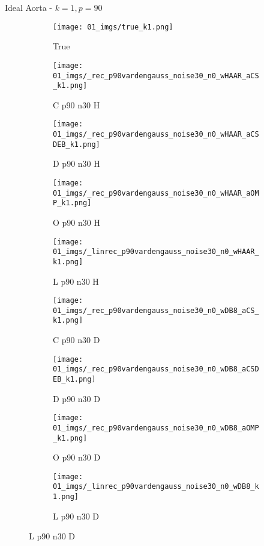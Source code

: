 \begin{frame}{Ideal Aorta - $k=1,p=90$}{}
\begin{figure}
\begin{subfigure}{0.1\textwidth}
\texttt{[image: 01\_imgs/true\_k1.png]}
\caption*{\Tiny True}
\end{subfigure}
\begin{subfigure}{0.1\textwidth}
\texttt{[image: 01\_imgs/\_rec\_p90vardengauss\_noise30\_n0\_wHAAR\_aCS\_k1.png]}
\caption*{\Tiny C p90 n30 H}
\end{subfigure}
\begin{subfigure}{0.1\textwidth}
\texttt{[image: 01\_imgs/\_rec\_p90vardengauss\_noise30\_n0\_wHAAR\_aCSDEB\_k1.png]}
\caption*{\Tiny D p90 n30 H}
\end{subfigure}
\begin{subfigure}{0.1\textwidth}
\texttt{[image: 01\_imgs/\_rec\_p90vardengauss\_noise30\_n0\_wHAAR\_aOMP\_k1.png]}
\caption*{\Tiny O p90 n30 H}
\end{subfigure}
\begin{subfigure}{0.1\textwidth}
\texttt{[image: 01\_imgs/\_linrec\_p90vardengauss\_noise30\_n0\_wHAAR\_k1.png]}
\caption*{\Tiny L p90 n30 H}
\end{subfigure}
\begin{subfigure}{0.1\textwidth}
\texttt{[image: 01\_imgs/\_rec\_p90vardengauss\_noise30\_n0\_wDB8\_aCS\_k1.png]}
\caption*{\Tiny C p90 n30 D}
\end{subfigure}
\begin{subfigure}{0.1\textwidth}
\texttt{[image: 01\_imgs/\_rec\_p90vardengauss\_noise30\_n0\_wDB8\_aCSDEB\_k1.png]}
\caption*{\Tiny D p90 n30 D}
\end{subfigure}
\begin{subfigure}{0.1\textwidth}
\texttt{[image: 01\_imgs/\_rec\_p90vardengauss\_noise30\_n0\_wDB8\_aOMP\_k1.png]}
\caption*{\Tiny O p90 n30 D}
\end{subfigure}
\begin{subfigure}{0.1\textwidth}
\texttt{[image: 01\_imgs/\_linrec\_p90vardengauss\_noise30\_n0\_wDB8\_k1.png]}
\caption*{\Tiny L p90 n30 D}
\end{subfigure}
\end{figure}
\end{frame}

